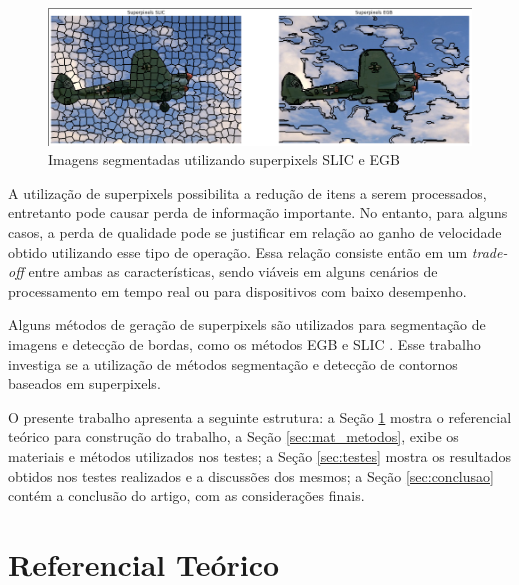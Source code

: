 \begin{document}
\begin{figure}[ht]
\centering
\includegraphics[width=1.\textwidth]{superpixels.png}
\caption{Imagens segmentadas utilizando superpixels SLIC e EGB}
\label{fig:superpixel}
\end{figure}

A utilização de superpixels possibilita a redução de itens a serem processados, entretanto pode causar perda de informação importante. No entanto, para alguns casos, a perda de qualidade pode se justificar em relação ao ganho de velocidade obtido utilizando esse tipo de operação. Essa relação consiste então em um \textit{trade-off} entre ambas as características, sendo viáveis em alguns cenários de processamento em tempo real ou para dispositivos com baixo desempenho.

Alguns métodos de geração de superpixels são utilizados para segmentação de imagens e detecção de bordas, como os métodos EGB \cite{FELZENSZWALB} e SLIC \cite{SLIC}. Esse trabalho investiga se a utilização de métodos segmentação e detecção de contornos baseados em superpixels.

O presente trabalho apresenta a seguinte estrutura: a Seção \ref{sec:ref_teorico} mostra o referencial teórico para construção do trabalho, a Seção  \ref{sec:mat_metodos}, exibe os materiais e métodos utilizados nos testes; a Seção \ref{sec:testes} mostra os resultados obtidos nos testes realizados e a discussões dos mesmos; a Seção \ref{sec:conclusao} contém a conclusão do artigo, com as considerações finais.



\section{Referencial Teórico} \label{sec:ref_teorico}

\end{document}
